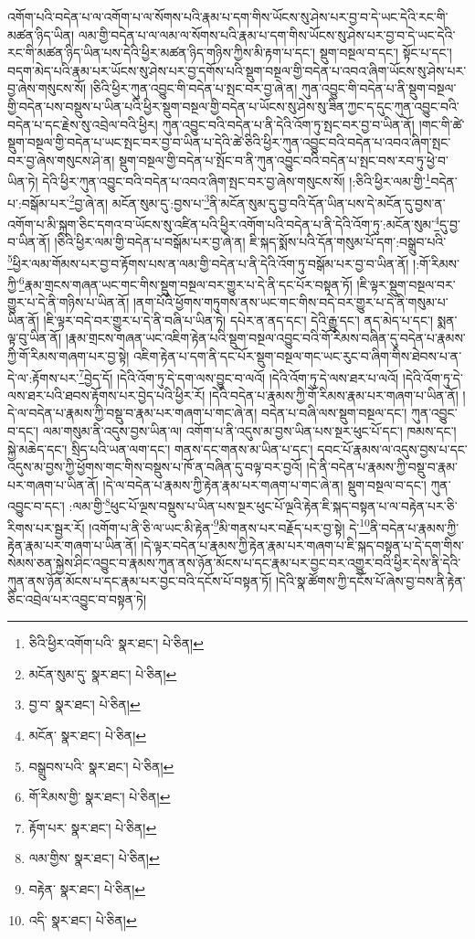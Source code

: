 འགོག་པའི་བདེན་པ་ལ་འགོག་པ་ལ་སོགས་པའི་རྣམ་པ་དག་གིས་ཡོངས་སུ་ཤེས་པར་བྱ་བ་དེ་ཡང་དེའི་རང་གི་མཚན་ཉིད་ཡིན། ལམ་གྱི་བདེན་པ་ལ་ལམ་ལ་སོགས་པའི་རྣམ་པ་དག་གིས་ཡོངས་སུ་ཤེས་པར་བྱ་བ་དེ་ཡང་དེའི་རང་གི་མཚན་ཉིད་ཡིན་པས་དེའི་ཕྱིར་མཚན་ཉིད་གཉིས་ཀྱིས་མི་རྟག་པ་དང་། སྡུག་བསྔལ་བ་དང་། སྟོང་པ་དང་། བདག་མེད་པའི་རྣམ་པར་ཡོངས་སུ་ཤེས་པར་བྱ་དགོས་པའི་སྡུག་བསྔལ་གྱི་བདེན་པ་འབའ་ཞིག་ཡོངས་སུ་ཤེས་པར་བྱ་ཞེས་གསུངས་སོ། །ཅིའི་ཕྱིར་ཀུན་འབྱུང་གི་བདེན་པ་སྤང་བར་བྱ་ཞེ་ན། ཀུན་འབྱུང་གི་བདེན་པ་ནི་སྡུག་བསྔལ་གྱི་བདེན་པས་བསྡུས་པ་ཡིན་པའི་ཕྱིར་སྡུག་བསྔལ་གྱི་བདེན་པ་ཡོངས་སུ་ཤེས་སུ་ཟིན་ཀྱང་ད་དུང་ཀུན་འབྱུང་བའི་བདེན་པ་དང་རྗེས་སུ་འབྲེལ་བའི་ཕྱིར། ཀུན་འབྱུང་བའི་བདེན་པ་ནི་དེའི་འོག་ཏུ་སྤང་བར་བྱ་བ་ཡིན་ནོ། །གང་གི་ཚེ་སྡུག་བསྔལ་གྱི་བདེན་པ་ཡང་སྤང་བར་བྱ་བ་ཡིན་པ་དེའི་ཚེ་ཅིའི་ཕྱིར་ཀུན་འབྱུང་བའི་བདེན་པ་འབའ་ཞིག་སྤང་བར་བྱ་ཞེས་གསུངས་ཤེ་ན། སྡུག་བསྔལ་གྱི་བདེན་པ་སྤོང་བ་ནི་ཀུན་འབྱུང་བའི་བདེན་པ་སྤང་བས་རབ་ཏུ་ཕྱེ་བ་ཡིན་ཏེ། དེའི་ཕྱིར་ཀུན་འབྱུང་བའི་བདེན་པ་འབའ་ཞིག་སྤང་བར་བྱ་ཞེས་གསུངས་སོ། །:ཅིའི་ཕྱིར་ལམ་གྱི་\footnote{ཅིའི་ཕྱིར་འགོག་པའི་  སྣར་ཐང་།  པེ་ཅིན། }བདེན་པ་:བསྒོམ་པར་\footnote{མངོན་སུམ་དུ་  སྣར་ཐང་།  པེ་ཅིན། }བྱ་ཞེ་ན། མངོན་སུམ་དུ་:བྱས་པ་\footnote{བྱ་བ་  སྣར་ཐང་།  པེ་ཅིན། }ནི་མངོན་སུམ་དུ་བྱ་བའི་དོན་ཡིན་པས་དེ་མངོན་དུ་བྱས་ན་འགོག་པ་མི་སྐྲག་ཅིང་དགའ་བ་ཡོངས་སུ་འཛིན་པའི་ཕྱིར་འགོག་པའི་བདེན་པ་ནི་དེའི་འོག་ཏུ་:མངོན་སུམ་\footnote{མངོན་  སྣར་ཐང་།  པེ་ཅིན། }དུ་བྱ་བ་ཡིན་ནོ། །ཅིའི་ཕྱིར་ལམ་གྱི་བདེན་པ་བསྒོམ་པར་བྱ་ཞེ་ན། ཇི་སྐད་སྨོས་པའི་དོན་གསུམ་པོ་དག་:བསྒྲུབ་པའི་\footnote{བསྒྲུབས་པའི་  སྣར་ཐང་།  པེ་ཅིན། }ཕྱིར་ལམ་གོམས་པར་བྱ་བ་རྟོགས་པས་ན་ལམ་གྱི་བདེན་པ་ནི་དེའི་འོག་ཏུ་བསྒོམ་པར་བྱ་བ་ཡིན་ནོ། །:གོ་རིམས་ཀྱི་\footnote{གོ་རིམས་གྱི་  སྣར་ཐང་།  པེ་ཅིན། }རྣམ་གྲངས་གཞན་ཡང་གང་གིས་སྡུག་བསྔལ་བར་གྱུར་པ་དེ་ནི་དང་པོར་བསྟན་ཏོ། །ཇི་ལྟར་སྡུག་བསྔལ་བར་གྱུར་པ་དེ་ནི་གཉིས་པ་ཡིན་ནོ། །ནག་པོའི་ཕྱོགས་གཏུགས་ནས་ཡང་གང་གིས་བདེ་བར་གྱུར་པ་དེ་ནི་གསུམ་པ་ཡིན་ནོ། །ཇི་ལྟར་བདེ་བར་གྱུར་པ་དེ་ནི་བཞི་པ་ཡིན་ཏེ། དཔེར་ན་ནད་དང་། དེའི་རྒྱུ་དང་། ནད་མེད་པ་དང་། སྨན་ལྟ་བུ་ཡིན་ནོ། །རྣམ་གྲངས་གཞན་ཡང་འཇིག་རྟེན་པའི་སྡུག་བསྔལ་འབྱུང་བའི་གོ་རིམས་བཞིན་དུ་བདེན་པ་རྣམས་ཀྱི་གོ་རིམས་གཞག་པར་བྱ་སྟེ། འཇིག་རྟེན་པ་དག་ནི་དང་པོར་སྡུག་བསྔལ་གང་ཡང་རུང་བ་ཞིག་གིས་ཐེབས་པ་ན་དེ་ལ་:རྟོགས་པར་\footnote{རྟོག་པར་  སྣར་ཐང་།  པེ་ཅིན། }བྱེད་དོ། །དེའི་འོག་ཏུ་དེ་དག་ལས་བྱུང་བ་ལའོ། །དེའི་འོག་ཏུ་དེ་ལས་ཐར་པ་ལའོ། །དེའི་འོག་ཏུ་དེ་ལས་ཐར་པའི་ཐབས་རྟོགས་པར་བྱེད་པའི་ཕྱིར་རོ། །དེའི་བདེན་པ་རྣམས་ཀྱི་གོ་རིམས་རྣམ་པར་གཞག་པ་ཡིན་ནོ། །དེ་ལ་བདེན་པ་རྣམས་ཀྱི་བསྡུ་བ་རྣམ་པར་གཞག་པ་གང་ཞེ་ན། བདེན་པ་བཞི་ལས་སྡུག་བསྔལ་དང་། ཀུན་འབྱུང་བ་དང་། ལམ་གསུམ་ནི་འདུས་བྱས་ཡིན་ལ། འགོག་པ་ནི་འདུས་མ་བྱས་ཡིན་པས་སྔར་ཕུང་པོ་དང་། ཁམས་དང་། སྐྱེ་མཆེད་དང་། སྲིད་པའི་ཡན་ལག་དང་། གནས་དང་གནས་མ་ཡིན་པ་དང་། དབང་པོ་རྣམས་ལ་འདུས་བྱས་པ་དང་འདུས་མ་བྱས་ཀྱི་ཕྱོགས་གང་གིས་བསྡུས་པ་ཁོ་ན་བཞིན་དུ་བལྟ་བར་བྱའོ། །དེ་ནི་བདེན་པ་རྣམས་ཀྱི་བསྡུ་བ་རྣམ་པར་གཞག་པ་ཡིན་ནོ། །དེ་ལ་བདེན་པ་རྣམས་ཀྱི་རྟེན་རྣམ་པར་གཞག་པ་གང་ཞེ་ན། སྡུག་བསྔལ་བ་དང་། ཀུན་འབྱུང་བ་དང་། :ལམ་གྱི་\footnote{ལམ་གྱིས་  སྣར་ཐང་།  པེ་ཅིན། }ཕུང་པོ་ལྔས་བསྡུས་པ་ཡིན་པས་སྔར་ཕུང་པོ་ལྔའི་རྟེན་ཇི་སྐད་བསྟན་པ་ལ་བརྟེན་པར་ཅི་རིགས་པར་སྦྱར་རོ། །འགོག་པ་ནི་ཅི་ལ་ཡང་མི་རྟེན་\footnote{བརྟེན་  སྣར་ཐང་།  པེ་ཅིན། }མི་གནས་པར་བརྗོད་པར་བྱ་སྟེ། དེ་\footnote{འདི་  སྣར་ཐང་།  པེ་ཅིན། }ནི་བདེན་པ་རྣམས་ཀྱི་རྟེན་རྣམ་པར་གཞག་པ་ཡིན་ནོ། །དེ་ལྟར་བདེན་པ་རྣམས་ཀྱི་རྟེན་རྣམ་པར་གཞག་པ་ཇི་སྐད་བསྟན་པ་དེ་དག་གིས་སེམས་ཅན་སྐྱེས་ཤིང་འབྱུང་བ་རྣམས་ཀུན་ནས་ཉོན་མོངས་པ་དང་རྣམ་པར་བྱང་བར་འགྱུར་བའི་ཕྱིར་དེས་ནི་དེའི་ཀུན་ནས་ཉོན་མོངས་པ་དང་རྣམ་པར་བྱང་བའི་དངོས་པོ་བསྟན་ཏོ། །དེའི་སྣ་ཚོགས་ཀྱི་དངོས་པོ་ཞེས་བྱ་བས་ནི་རྟེན་ཅིང་འབྲེལ་པར་འབྱུང་བ་བསྟན་ཏེ། 